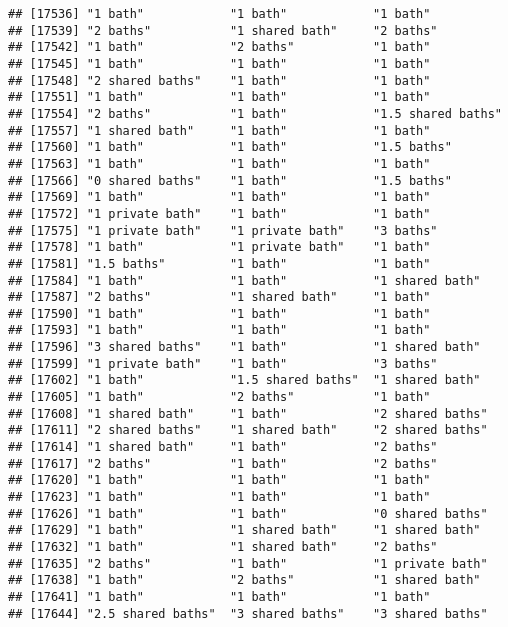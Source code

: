 \documentclass[
]{article}
\begin{document}
\begin{verbatim}
## [17536] "1 bath"            "1 bath"            "1 bath"           
## [17539] "2 baths"           "1 shared bath"     "2 baths"          
## [17542] "1 bath"            "2 baths"           "1 bath"           
## [17545] "1 bath"            "1 bath"            "1 bath"           
## [17548] "2 shared baths"    "1 bath"            "1 bath"           
## [17551] "1 bath"            "1 bath"            "1 bath"           
## [17554] "2 baths"           "1 bath"            "1.5 shared baths" 
## [17557] "1 shared bath"     "1 bath"            "1 bath"           
## [17560] "1 bath"            "1 bath"            "1.5 baths"        
## [17563] "1 bath"            "1 bath"            "1 bath"           
## [17566] "0 shared baths"    "1 bath"            "1.5 baths"        
## [17569] "1 bath"            "1 bath"            "1 bath"           
## [17572] "1 private bath"    "1 bath"            "1 bath"           
## [17575] "1 private bath"    "1 private bath"    "3 baths"          
## [17578] "1 bath"            "1 private bath"    "1 bath"           
## [17581] "1.5 baths"         "1 bath"            "1 bath"           
## [17584] "1 bath"            "1 bath"            "1 shared bath"    
## [17587] "2 baths"           "1 shared bath"     "1 bath"           
## [17590] "1 bath"            "1 bath"            "1 bath"           
## [17593] "1 bath"            "1 bath"            "1 bath"           
## [17596] "3 shared baths"    "1 bath"            "1 shared bath"    
## [17599] "1 private bath"    "1 bath"            "3 baths"          
## [17602] "1 bath"            "1.5 shared baths"  "1 shared bath"    
## [17605] "1 bath"            "2 baths"           "1 bath"           
## [17608] "1 shared bath"     "1 bath"            "2 shared baths"   
## [17611] "2 shared baths"    "1 shared bath"     "2 shared baths"   
## [17614] "1 shared bath"     "1 bath"            "2 baths"          
## [17617] "2 baths"           "1 bath"            "2 baths"          
## [17620] "1 bath"            "1 bath"            "1 bath"           
## [17623] "1 bath"            "1 bath"            "1 bath"           
## [17626] "1 bath"            "1 bath"            "0 shared baths"   
## [17629] "1 bath"            "1 shared bath"     "1 shared bath"    
## [17632] "1 bath"            "1 shared bath"     "2 baths"          
## [17635] "2 baths"           "1 bath"            "1 private bath"   
## [17638] "1 bath"            "2 baths"           "1 shared bath"    
## [17641] "1 bath"            "1 bath"            "1 bath"           
## [17644] "2.5 shared baths"  "3 shared baths"    "3 shared baths"   

\end{verbatim}
\end{document}
